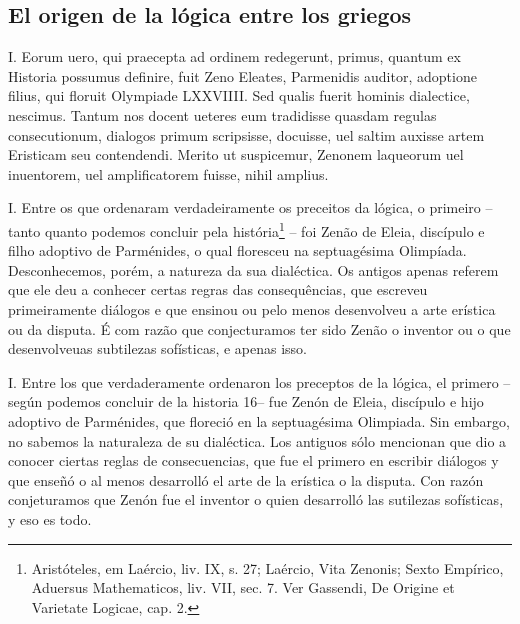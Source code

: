 \documentclass{article}
\begin{document}
\begin{paracol}{3}
\begin{nthcolumn}{2}
    \subsection*{\centering El origen de la lógica entre los griegos} 
  \end{nthcolumn}
\vspace{0.5cm}
  \begin{nthcolumn*}{0} %
    I. Eorum uero, qui praecepta ad ordinem redegerunt, primus, quantum ex Historia possumus definire, fuit Zeno Eleates, Parmenidis auditor, adoptione filius, qui floruit Olympiade LXXVIIII. Sed qualis fuerit hominis dialectice, nescimus. Tantum nos docent ueteres eum tradidisse quasdam regulas consecutionum, dialogos primum scripsisse, docuisse, uel saltim auxisse artem Eristicam seu contendendi. Merito ut suspicemur, Zenonem laqueorum uel inuentorem, uel amplificatorem fuisse, nihil amplius.    
  \end{nthcolumn*}
  \vspace{0.5cm}
  \begin{nthcolumn}{1} %
    I. Entre os que ordenaram verdadeiramente os preceitos da lógica, o primeiro – tanto quanto podemos concluir pela história\footnote[16]{Aristóteles, em Laércio, liv. IX, s. 27; Laércio, Vita Zenonis; Sexto Empírico, Aduersus Mathematicos, liv. VII, sec. 7. Ver Gassendi, De Origine et Varietate Logicae, cap. 2.} – foi Zenão de Eleia, discípulo e filho adoptivo de Parménides, o qual floresceu na septuagésima Olimpíada. Desconhecemos, porém, a natureza da sua dialéctica. Os antigos apenas referem que ele deu a conhecer certas regras das consequências, que escreveu primeiramente diálogos e que ensinou ou pelo menos desenvolveu a arte erística ou da disputa. É com razão que conjecturamos ter sido Zenão o inventor ou o que desenvolveuas subtilezas sofísticas, e apenas isso.    
  \end{nthcolumn}
  \vspace{0.5cm}
  \begin{nthcolumn}{2} %
    I. Entre los que verdaderamente ordenaron los preceptos de la lógica, el primero –según podemos concluir de la historia 16– fue Zenón de Eleia, discípulo e hijo adoptivo de Parménides, que floreció en la septuagésima Olimpiada. Sin embargo, no sabemos la naturaleza de su dialéctica. Los antiguos sólo mencionan que dio a conocer ciertas reglas de consecuencias, que fue el primero en escribir diálogos y que enseñó o al menos desarrolló el arte de la erística o la disputa. Con razón conjeturamos que Zenón fue el inventor o quien desarrolló las sutilezas sofísticas, y eso es todo.    

\end{nthcolumn}
\end{paracol}
\end{document}
